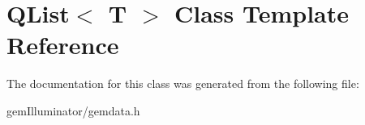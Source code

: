 \hypertarget{class_q_list}{}\section{Q\+List$<$ T $>$ Class Template Reference}
\label{class_q_list}


The documentation for this class was generated from the following file\+:\begin{DoxyCompactItemize}
\item 
gem\+Illuminator/gemdata.\+h\end{DoxyCompactItemize}
